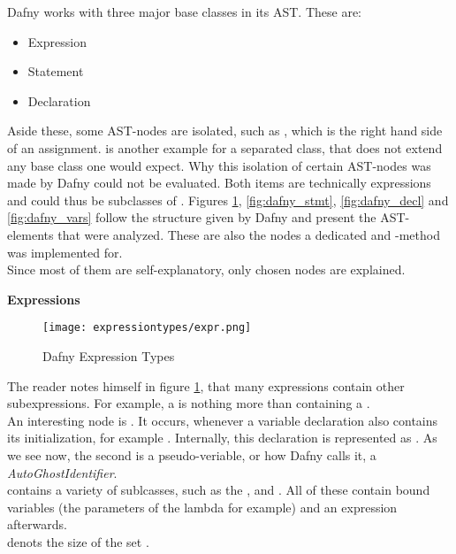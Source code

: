 Dafny works with three major base classes in its AST.
These are:
\begin{itemize}
    \item Expression
    \item Statement
    \item Declaration
\end{itemize}
Aside these, some AST-nodes are isolated, such as , which is the right hand side of an assignment.
 is another example for a separated class, that does not extend any base class one would expect.
Why this isolation of certain AST-nodes was made by Dafny could not be evaluated.
Both items are technically expressions and could thus be subclasses of .
Figures \ref{fig:dafny_expr}, \ref{fig:dafny_stmt}, \ref{fig:dafny_decl} and \ref{fig:dafny_vars} follow the structure given by Dafny and present the AST-elements that were analyzed.
These are also the nodes a dedicated  and -method was implemented for.\\

Since most of them are self-explanatory, only chosen nodes are explained.

\pagebreak

\textbf{Expressions}\\
\begin{figure}[H]
    \centering
    \texttt{[image: expressiontypes/expr.png]}
    \caption{Dafny Expression Types}
    \label{fig:dafny_expr}
\end{figure}

The reader notes himself in figure \ref{fig:dafny_expr}, that many expressions contain other subexpressions.
For example, a  is nothing more than containing a .\\

An interesting node is .
It occurs, whenever a variable declaration also contains its initialization, for example .
Internally, this declaration is represented as .
As we see now, the second  is a pseudo-veriable, or how Dafny calls it, a \textit{AutoGhostIdentifier}.\\

 contains a variety of sublcasses, such as the ,  and .
All of these contain bound variables (the parameters of the lambda for example) and an expression afterwards.\\
 denots the size of the set .\\

